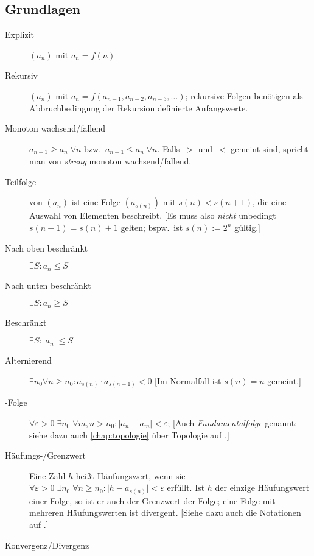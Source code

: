 \subsection{Grundlagen}
\begin{description}
  \item [Explizit] $(a_n)$ mit $a_n = f(n)$
  \item [Rekursiv] $(a_n)$ mit $a_n = f(a_{n-1}, a_{n-2}, a_{n-3}, \ldots)$; rekursive Folgen benötigen als Abbruchbedingung der Rekursion definierte Anfangswerte.
  \item [Monoton wachsend/fallend] $a_{n+1} \geq a_n \; \forall n$ bzw.~$a_{n+1} \leq a_n \; \forall n$.
        Falls~$>$ und~$<$ gemeint sind, spricht man von \emph{streng} monoton wachsend/fallend.
  \item [Teilfolge] von $(a_n)$ ist eine Folge $(a_{s(n)})$ mit $s(n) < s(n+1)$, die eine Auswahl von Elementen beschreibt.
        [Es muss also \emph{nicht} unbedingt $s(n+1) = s(n)+1$ gelten; bspw.~ist $s(n):=2^n$ gültig.]
  \item [Nach oben beschränkt] 
        $\exists S : a_n \leq S$
  \item [Nach unten beschränkt]
        $\exists S : a_n \geq S$
  \item [Beschränkt] 
        $\exists S : \lvert a_n \rvert \leq S$
  \item [Alternierend] 
        $\exists n_0 \forall n \geq n_0 : a_{s(n)} \cdot a_{s(n+1)} < 0$
        [Im Normalfall ist $s(n)=n$ gemeint.]
  \item [-Folge] 
        $\forall \varepsilon>0\; \exists n_0\; \forall m,n>n_0 : \lvert a_n-a_m \rvert < \varepsilon$;
        [Auch \emph{Fundamentalfolge} genannt; siehe dazu auch \cref{chap:topologie} über Topologie auf .]
  \item [Häufungs-/Grenzwert]  
        Eine Zahl $h$ heißt Häufungswert, wenn sie $\forall \varepsilon>0 \; \exists n_0 \; \forall n \geq n_0 : \lvert h-a_{s(n)} \rvert < \varepsilon$ erfüllt.
        Ist $h$ der einzige Häufungswert einer Folge, so ist er auch der Grenzwert der Folge; eine Folge mit mehreren Häufungswerten ist divergent.
        [Siehe dazu auch die Notationen auf .]
  \item [Konvergenz/Divergenz] 

\end{description}
